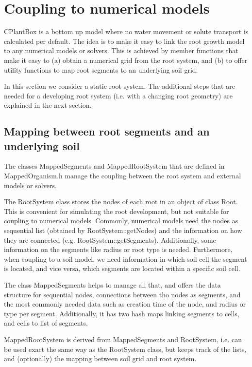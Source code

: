\newpage
\section{Coupling to numerical models}

CPlantBox is a bottom up model where no water movement or solute transport is calculated per default. The idea is to make it easy to link the root growth model to any numerical models or solvers. This is achieved by member functions that make it easy to (a) obtain a numerical grid from the root system, and (b) to offer utility functions to map root segments to an underlying soil grid. 

In this section we consider a static root system. The additional steps that are needed for a developing root system (i.e. with a changing root geometry) are explained in the next section. 

\subsection{Mapping between root segments and an underlying soil}

The classes MappedSegments and MappedRootSystem that are defined in MappedOrganism.h manage the coupling between the root system and external models or solvers. 

The RootSystem class stores the nodes of each root in an object of class Root. This is convenient for simulating the root development, but not suitable for coupling to numerical models. Commonly, numerical models need the nodes as sequential list (obtained by RootSystem::getNodes) and the information on how they are connected (e.g. RootSystem::getSegments). Additionally, some information on the segments like radius or root type is needed. Furthermore, when coupling to a soil model, we need information in which soil cell the segment is located, and vice versa, which segments are located within a specific soil cell. 

The class MappedSegments helps to manage all that, and offers the data structure for sequential nodes, connections between tho nodes as segments, and the most commonly needed data such as creation time of the node, and radius or type per segment. Additionally, it has two hash maps linking segments to cells, and cells to list of segments.

MappedRootSystem is derived from MappedSegments and RootSystem, i.e. can be used exact the same way as the RootSystem class, but keeps track of the lists, and (optionally) the mapping between soil grid and root system.

